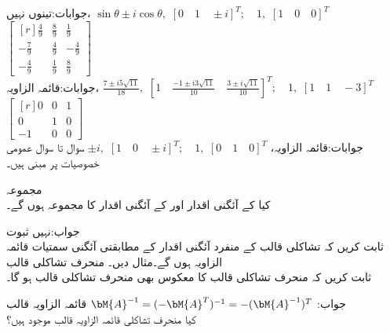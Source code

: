 جوابات:تینوں نہیں، 
$\sin \theta\pm i\cos \theta,\,\,[0\quad 1 \quad \pm i]^T;\quad  1,\,\,[1\quad 0\quad 0]^T$
\quad
$\begin{bmatrix*}[r] \tfrac{4}{9}&\tfrac{8}{9}&\tfrac{1}{9}\\-\tfrac{7}{9}&\tfrac{4}{9}&-\tfrac{4}{9}\\-\tfrac{4}{9}&\tfrac{1}{9}&\tfrac{8}{9} \end{bmatrix*}$\\
جوابات:قائمہ الزاویہ، 
$\tfrac{7\pm i5\sqrt{11}}{18},\,\,[1\quad \tfrac{-1\pm i3\sqrt{11}}{10}\quad \tfrac{3\pm i\sqrt{11}}{10}]^T;\quad  1,\,\,[1\quad 1\quad -3]^T$
\quad
$\begin{bmatrix*}[r] 0&0&1\\0&1&0\\ -1&0&0\end{bmatrix*}$\\
جوابات:قائمہ الزاویہ، 
$\pm i,\,\,[1\quad 0 \quad \pm i]^T;\quad  1,\,\,[0\quad 1\quad 0]^T$
سوال  تا سوال  عمومی خصوصیات پر مبنی ہیں۔

\quad مجموعہ\\
کیا  کے آئگنی اقدار  اور  کے آئگنی اقدار کا مجموعہ ہوں گے۔

جواب:نہیں
\quad ثبوت\\
ثابت کریں کہ تشاکلی قالب کے منفرد آئگنی اقدار کے مطابقتی آئگنی سمتیات قائمہ الزاویہ ہوں گے۔مثال دیں۔
\quad منحرف تشاکلی قالب\\
ثابت کریں کہ منحرف تشاکلی قالب کا معکوس بھی منحرف تشاکلی قالب ہو گا۔

جواب:
$\bM{A}^{-1}=(-\bM{A}^T)^{-1}=-(\bM{A}^{-1})^T$
\quad قائمہ الزاویہ قالب\\
کیا  منحرف تشاکلی قائمہ الزاویہ قالب موجود ہیں؟

